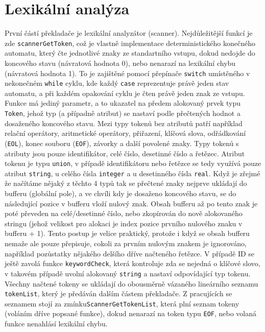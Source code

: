 \documentclass[a4paper, 12pt]{article}
\begin{document}
\newpage

\section{Lexikální analýza}
První částí překladače je lexikální analyzátor (scanner). Nejdůležitější funkcí je zde \linebreak \verb|scannerGetToken|, což je vlastně implementace deterministického konečného automatu, který čte jednotlivé znaky ze standartního vstupu, dokud nedojde do koncového stavu (návratová hodnota 0), nebo nenarazí na lexikální chybu (návratová hodnota 1). To je zajištěné pomocí přepínače \verb|switch| umístěného v nekonečném \verb|while| cyklu, kde každý \verb|case| reprezentuje právě jeden stav automatu, a při každém opakování cyklu je čten právě jeden znak ze vstupu.
\newline
\newline
Funkce má jediný parametr, a to ukazatel na předem alokovaný prvek typu \verb|Token|, jehož typ (a případně atribut) se nastaví podle přečtených hodnot a dosaženého koncového stavu. Mezi typy tokenů bez atributů patří například relační operátory, aritmetické operátory, přiřazení, klíčová slova, odřádkování (\verb|EOL|), konec souboru (\verb|EOF|), závorky a další povolené znaky.
\newline
\newline
Typy tokenů s atributy jsou pouze identifikátor, celé číslo, desetinné číslo a řetězec. Atribut tokenu je typu \verb|union|, v případě identifikátoru nebo řetězce se tedy využívá pouze atribut \verb|string|, u celého čísla \verb|integer| a u desetinného čísla \verb|real|. Když je zřejmé že načítáme nějaký z těchto 4 typů tak se přečtené znaky nejprve ukládají do bufferu (globální pole), a ve chvíli kdy je dosaženo koncového stavu, se do následující pozice v bufferu vloží nulový znak. Obsah bufferu až po tento znak je poté převeden na celé/desetinné číslo, nebo zkopírován do nově alokovaného stringu (jehož velikost pro alokaci je index pozice prvního nulového znaku v bufferu + 1). Tento postup je velice praktický, protože i když se obsah bufferu nemaže ale pouze přepisuje, cokoli za prvním nulovým znakem je ignorováno, například pozůstatky nějakého delšího dříve načteného řetězce. V případě ID se ještě zavolá funkce \verb|keywordCheck|, která kontroluje zda se nejedná o klíčové slovo, v takovém případě uvolní alokovaný \verb|string| a nastaví odpovídající typ tokenu.
\newline
\newline
Všechny načtené tokeny se ukládají do obousměrně vázaného lineárního seznamu \verb|tokenList|, který je předáván dalším částem překladače. Z pracujících se seznamem stojí za zmínku\linebreak \verb|ScannerGetTokenList|, která plní seznam tokeny (voláním dříve popsané funkce), dokud nenarazí na token typu \verb|EOF|, nebo volaná funkce nenahlásí lexikální chybu. 
\end{document}

